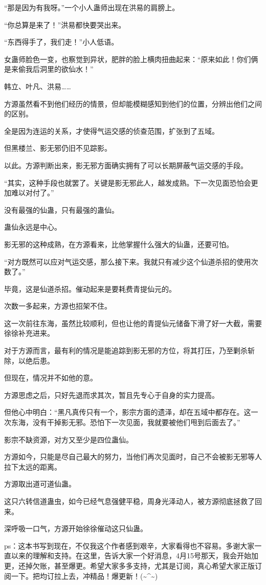 \begin{this_body}
“那是因为有我呀。”一个小人蛊师出现在洪易的肩膀上。

“你总算是来了！”洪易都快要哭出来。

“东西得手了，我们走！”小人低语。

女蛊师脸色一变，也察觉到异状，肥胖的脸上横肉扭曲起来：“原来如此！你们俩是来偷我后洞里的欲仙水！”

韩立、叶凡、洪易……

方源虽然看不到他们经历的情景，但却能模糊感知到他们的位置，分辨出他们之间的区别。

全是因为连运的关系，才使得气运交感的侦查范围，扩张到了五域。

但黑楼兰、影无邪仍旧不见踪影。

以此。方源判断出来，影无邪方面确实拥有了可以长期屏蔽气运交感的手段。

“其实，这种手段也就罢了。关键是影无邪此人，越发成熟。下一次见面恐怕会更加难以对付了。”

没有最强的仙蛊，只有最强的蛊仙。

蛊仙永远是中心。

影无邪的这种成熟，在方源看来，比他掌握什么强大的仙蛊，还要可怕。

“对方既然可以应对气运交感，那么接下来。我就只有减少这个仙道杀招的使用次数了。”

毕竟，这是仙道杀招。催动起来是要耗费青提仙元的。

次数一多起来，方源也招架不住。

这一次前往东海，虽然比较顺利，但也让他的青提仙元储备下滑了好一大截，需要徐徐补充进来。

对于方源而言，最有利的情况是能追踪到影无邪的方位，将其打压，乃至剿杀斩除，以绝后患。

但现在，情况并不如他的意。

方源思虑之后，只好先退而求其次，暂且先专心于自身的实力提高。

但他心中明白：“黑凡真传只有一个，影宗方面的遗泽，却在五域中都存在。这一次东海，没有干掉影无邪。恐怕下一次见面，我就要被他们甩到后面去了。”

影宗不缺资源，对方又至少是四位蛊仙。

方源如今，只能是尽自己最大的努力，当他们再次见面时，自己不会被影无邪等人拉下太远的距离。

方源取出道可道仙蛊。

这只六转信道蛊虫，如今已经气息强健平稳，周身光泽动人，被方源彻底拯救了回来。

深呼吸一口气，方源开始徐徐催动这只仙蛊。

ps：这本书写到现在，不仅我这个作者感到艰辛，大家看得也不容易。多谢大家一直以来的理解和支持。在这里，告诉大家一个好消息，4月15号那天，我会开始加更，还掉欠账，甚至爆更。希望大家多多支持，尤其是订阅，真心希望大家正版订阅一下。把均订拉上去，冲精品！爆更新！(\~{}\^{}\~{})

\end{this_body}

